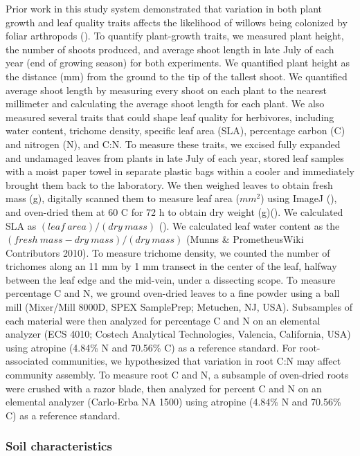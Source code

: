 \documentclass[11pt]{article}
\begin{document}
Prior work in this study system demonstrated that variation in both
plant growth and leaf quality traits affects the likelihood of willows
being colonized by foliar arthropods (\citealt{Barbour_2015}). To quantify
plant-growth traits, we measured plant height, the number of shoots
produced, and average shoot length in late July of each year (end of
growing season) for both experiments. We quantified plant height as the
distance (mm) from the ground to the tip of the tallest shoot. We
quantified average shoot length by measuring every shoot on each plant
to the nearest millimeter and calculating the average shoot length for
each plant. We also measured several traits that could shape leaf
quality for herbivores, including water content, trichome density,
specific leaf area (SLA), percentage carbon (C) and nitrogen (N), and
C:N. To measure these traits, we excised fully expanded and undamaged
leaves from plants in late July of each year, stored leaf samples with a
moist paper towel in separate plastic bags within a cooler and
immediately brought them back to the laboratory. We then weighed leaves
to obtain fresh mass (g), digitally scanned them to measure leaf area
(\(mm^2\)) using ImageJ (\citealt{abramoff2004image}), and oven-dried them at
60 \degree C for 72 h to obtain dry weight (g)(\citealt{cornelissen2003handbook}). We calculated
SLA as $(leaf\ area)/(dry\ mass)$  (\citealt{cornelissen2003handbook}). We calculated leaf water content as
the $(fresh\ mass - dry\ mass)/(dry\ mass)$ (Munns \& PrometheusWiki Contributors 2010). To
measure trichome density, we counted the number of trichomes along an 11
mm by 1 mm transect in the center of the leaf, halfway between the leaf
edge and the mid-vein, under a dissecting scope. To measure percentage C
and N, we ground oven-dried leaves to a fine powder using a ball mill
(Mixer/Mill 8000D, SPEX SamplePrep; Metuchen, NJ, USA). Subsamples of
each material were then analyzed for percentage C and N on an elemental
analyzer (ECS 4010; Costech Analytical Technologies, Valencia,
California, USA) using atropine (4.84\% N and 70.56\% C) as a reference
standard. For root-associated communities, we hypothesized that
variation in root C:N may affect community assembly. To measure root C
and N, a subsample of oven-dried roots were crushed with a razor blade,
then analyzed for percent C and N on an elemental analyzer (Carlo-Erba
NA 1500) using atropine (4.84\% N and 70.56\% C) as a reference
standard.

\subsubsection*{Soil characteristics}
\end{document}
